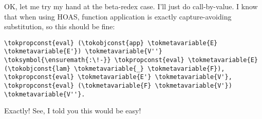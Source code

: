 \importantCodeblockEnd{}

\heroSTUDENT{} OK, let me try my hand at the beta-redex case. I'll just do
call-by-value. I know that when using HOAS, function application is
exactly capture-avoiding substitution, so this should be fine:

\importantCodeblock{}

\begin{verbatim}
\tokpropconst{eval} (\tokobjconst{app} \tokmetavariable{E} \tokmetavariable{E'}) \tokmetavariable{V''} \toksymbol{\ensuremath{:\!-}} \tokpropconst{eval} \tokmetavariable{E} (\tokobjconst{lam} \tokmetavariable{_} \tokmetavariable{F}), \tokpropconst{eval} \tokmetavariable{E'} \tokmetavariable{V'}, \tokpropconst{eval} (\tokmetavariable{F} \tokmetavariable{V'}) \tokmetavariable{V''}.
\end{verbatim}

\importantCodeblockEnd{}

\heroADVISOR{} Exactly! See, I told you this would be easy!
